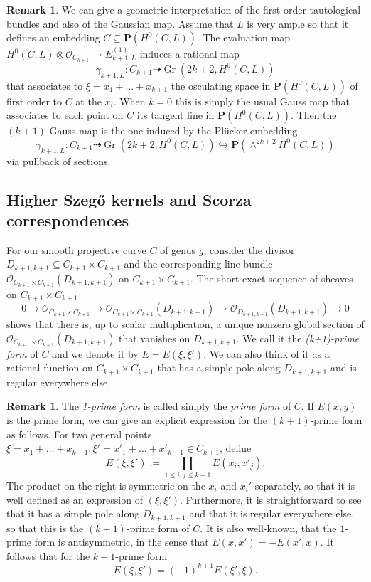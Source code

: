 \documentclass[12pt]{amsart}
\newcounter{thmcounter}
\numberwithin{equation}{section}
\numberwithin{thmcounter}{section}
\theoremstyle{definition}
\newtheorem{remark}[thmcounter]{Remark}
\theoremstyle{claim}
\newcommand{\nP}{\mathbf{P}}
\newcommand{\sO}{\mathscr{O}}
\begin{document}
\begin{remark}
	We can give a geometric interpretation of the first order tautological bundles and also of the Gaussian map. Assume that $L$ is very ample so that it defines an embedding $C\subseteq \nP(H^0(C,L))$. The evaluation map
	$H^0(C,L)\otimes \sO_{C_{k+1}} \to E^{(1)}_{k+1,L}$ induces a rational map
	\[ \gamma_{k+1,L}\colon C_{k+1} \dashrightarrow \operatorname{Gr}(2k+2,H^0(C,L)) \]
	that associates to $\xi=x_1+\dots+x_{k+1}$ the osculating space in $\nP(H^0(C,L))$ of first order to $C$ at the $x_i$. When $k=0$ this is simply the usual Gauss map that associates to each point on $C$ its tangent line in $\nP(H^0(C,L))$. Then the $(k+1)$-Gauss map is the one induced by the Pl\"ucker embedding
	\[ \gamma_{k+1,L}\colon C_{k+1} \dashrightarrow \operatorname{Gr}(2k+2,H^0(C,L)) \hookrightarrow \nP(\wedge^{2k+2}H^0(C,L)) \]
	via pullback of sections.
\end{remark}




\subsection{Higher Szeg\H{o} kernels and Scorza correspondences}\label{sec:szego}
For our smooth projective curve $C$ of genus $g$, consider the divisor $D_{k+1,k+1}\subseteq C_{k+1}\times C_{k+1}$ and the corresponding line bundle $\sO_{C_{k+1} \times C_{k+1}}(D_{k+1,k+1})$ on $C_{k+1}\times C_{k+1}$. The short exact sequence of sheaves on $C_{k+1}\times C_{k+1}$
\[ 0 \longrightarrow \sO_{C_{k+1} \times C_{k+1}} \longrightarrow \sO_{C_{k+1} \times C_{k+1}}(D_{k+1,k+1}) \longrightarrow \sO_{D_{k+1,k+1}}(D_{k+1,k+1}) \longrightarrow 0 \]
shows that there is, up to scalar multiplication, a unique nonzero global section of $\sO_{C_{k+1} \times C_{k+1}}(D_{k+1,k+1})$ that vanishes on $D_{k+1,k+1}$. We call it the \emph{(k+1)-prime form} of $C$ and we denote it by $E=E(\xi,\xi')$. We can also think of it as a rational function on $C_{k+1}\times C_{k+1}$ that has a simple pole along $D_{k+1,k+1}$ and is regular everywhere else.

\begin{remark}
The \emph{1-prime form} is called simply the \emph{prime form} of $C$. If $E(x,y)$ is the prime form, we can give an explicit expression for the $(k+1)$-prime form as follows. For two general points $\xi=x_1+\dots+x_{k+1},\xi'=x'_1+\dots+x'_{k+1} \in C_{k+1}$, define
\[ E(\xi,\xi') := \prod_{1 \leq i,j \leq k+1 } E(x_i,x'_j). \]
The product on the right is symmetric on the $x_i$ and $x_i'$ separately, so that it is well defined as an expression of $(\xi,\xi')$. Furthermore, it is straightforward to see that it has a simple pole along $D_{k+1,k+1}$ and that it is  regular everywhere else, so that this is the $(k+1)$-prime form of $C$. It is also well-known, that the $1$-prime form is antisymmetric, in the sense that $E(x,x')=-E(x',x)$. It follows that for the $k+1$-prime form
\[ E(\xi,\xi') = (-1)^{k+1} E(\xi',\xi). \]
\end{remark}
\end{document}
